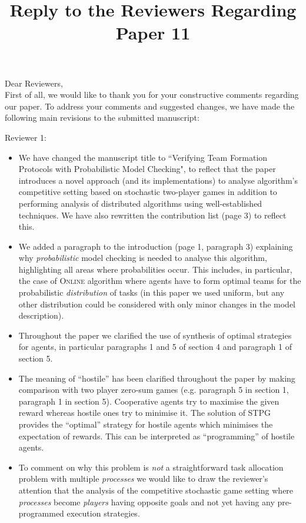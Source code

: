 \documentclass[a4paper,10pt]{article}
\title{Reply to the Reviewers Regarding Paper 11}
\author{}
\begin{document}
\maketitle

\noindent Dear Reviewers, \\

\noindent First of all, we would like to thank you for your constructive comments regarding our paper.
To address your comments and suggested changes, we have made the following main revisions to the submitted manuscript:
\medskip

\noindent Reviewer 1:
\begin{itemize}

\item We have changed the manuscript title to ``Verifying Team Formation Protocols with Probabilistic Model Checking", to reflect that the paper introduces a novel approach (and its implementations) to analyse algorithm's competitive setting based on stochastic two-player games in addition to performing analysis of distributed algorithms using well-established techniques. We have also rewritten the contribution list (page 3) to reflect this.

\item We added a paragraph to the introduction (page 1, paragraph 3) explaining why \emph{probabilistic} model checking is needed to analyse this algorithm, highlighting all areas where probabilities occur. This includes, in particular, the case of \textsc{Online} algorithm where agents have to form optimal teams for the probabilistic \emph{distribution} of tasks (in this paper we used uniform, but any other distribution could be considered with only minor changes in the model description).

\item Throughout the paper we clarified the use of synthesis of optimal strategies for agents, in particular paragraphs 1 and 5 of section 4 and paragraph 1 of section 5.

\item The meaning of ``hostile'' has been clarified throughout the paper by making comparison with two player zero-sum games (e.g. paragraph 5 in section 1, paragraph 1 in section 5). Cooperative agents try to maximise the given reward whereas hostile ones try to minimise it. The solution of STPG provides the ``optimal'' strategy for hostile agents which minimises the expectation of rewards. This can be interpreted as ``programming'' of hostile agents.

\item To comment on why this problem is \emph{not} a straightforward task allocation problem with multiple \emph{processes} we would like to draw the reviewer's attention that the analysis of the competitive stochastic game setting where \emph{processes} become \emph{players} having opposite goals and not yet having any pre-programmed execution strategies.

\end{itemize}
\end{document}
